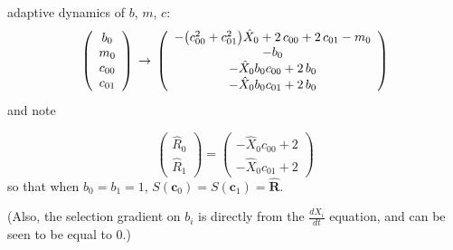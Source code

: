 \documentclass{article}
\begin{document}
adaptive dynamics of $b$, $m$, $c$:
\[\left(\begin{array}{c}
  b_{0}\\
  m_{0}\\
  c_{00}\\
  c_{01}
\end{array}\right)\\
\to\\
\left(\begin{array}{c}
  -{\left({c}_{00}^{2} + {c}_{01}^{2}\right)} \hat{X}_{0} + 2 \, {c}_{00} + 2 \, {c}_{01} - m_{0}\\
  -b_{0}\\
  -\hat{X}_{0} b_{0} {c}_{00} + 2 \, b_{0}\\
  -\hat{X}_{0} b_{0} {c}_{01} + 2 \, b_{0}
\end{array}\right)\]
and note

\[
  \left(\begin{array}{c}
  \hat{R}_{0}\\
  \hat{R}_{1}
\end{array}\right) = \left(\begin{array}{c}
  -\hat{X}_{0} {c}_{00} + 2\\
  -\hat{X}_{0} {c}_{01} + 2
\end{array}\right)
\]
so that when $b_0=b_1=1$, $S(\mathbf{c}_0)=S(\mathbf{c}_1)=\hat{\mathbf{R}}$.

(Also, the selection gradient on $b_i$ is directly from the $\frac{dX_i}{dt}$ equation, and can be seen to be equal to 0.)
\end{document}
